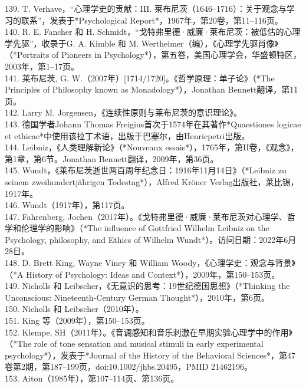 139. T. Verhave，“心理学史的贡献：III. 莱布尼茨（1646–1716）：关于观念与学习的联系”，发表于*Psychological Report*，1967年，第20卷，第11–116页。\\
140. R. E. Fancher 和 H. Schmidt，“戈特弗里德·威廉·莱布尼茨：被低估的心理学先驱”，收录于G. A. Kimble 和 M. Wertheimer（编），《心理学先驱肖像》（*Portraits of Pioneers in Psychology*），第五卷，美国心理学会，华盛顿特区，2003年，第1–17页。\\
141. 莱布尼茨, G. W.（2007年）[1714/1720]。《哲学原理：单子论》（*The Principles of Philosophy known as Monadology*），Jonathan Bennett翻译，第11页。\\
142. Larry M. Jorgensen，《连续性原则与莱布尼茨的意识理论》。\\
143. 德国学者Johann Thomas Freigius首次于1574年在其著作*Quaestiones logicae et ethicae*中使用该拉丁术语，出版于巴塞尔，由Henricpetri出版。\\
144. Leibniz，《人类理解新论》（*Nouveaux essais*），1765年，第II卷，《观念》，第1章，第6节。Jonathan Bennett翻译，2009年，第36页。\\
145. Wundt，《莱布尼茨逝世两百周年纪念日：1916年11月14日》（*Leibniz zu seinem zweihundertjährigen Todestag*），Alfred Kröner Verlag出版社，莱比锡，1917年。\\
146. Wundt（1917年），第117页。\\
147. Fahrenberg, Jochen（2017年）。《戈特弗里德·威廉·莱布尼茨对心理学、哲学和伦理学的影响》（*The influence of Gottfried Wilhelm Leibniz on the Psychology, philosophy, and Ethics of Wilhelm Wundt*）。访问日期：2022年6月28日。\\
148. D. Brett King, Wayne Viney 和 William Woody，《心理学史：观念与背景》（*A History of Psychology: Ideas and Context*），2009年，第150–153页。\\
149. Nicholls 和 Leibscher，《无意识的思考：19世纪德国思想》（*Thinking the Unconscious: Nineteenth-Century German Thought*），2010年，第6页。\\
150. Nicholls 和 Leibscher（2010年）。\\
151. King 等（2009年），第150–153页。\\
152. Klempe, SH（2011年）。《音调感知和音乐刺激在早期实验心理学中的作用》（*The role of tone sensation and musical stimuli in early experimental psychology*），发表于*Journal of the History of the Behavioral Sciences*，第47卷第2期，第187–199页，doi:10.1002/jhbs.20495，PMID 21462196。\\
153. Aiton（1985年），第107–114页、第136页。\\
